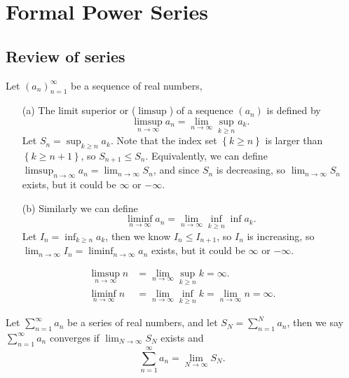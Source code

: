 \chapter{Formal Power Series}
\section{Review of series}
\begin{definition}
    Let \((a_n)_{n=1}^{\infty} \) be a sequence of real numbers,
    \begin{itemize}
        \item [(a)] The limit superior or (\(\limsup\)) of a sequence \((a_n)\) is defined by 
        \[\limsup_{n \to \infty} a_n = \lim_{n \to \infty} \sup _{k \ge n} a_k.  \]
        Let \(S_n = \sup _{k \ge n} a_k\). Note that the index set \(\left\{ k \ge n \right\} \) is larger than \(\left\{ k \ge n+1 \right\} \), so \(S_{n+1} \le S_n\). Equivalently, we can define \(\limsup_{n \to \infty} a_n = \lim_{n \to \infty} S_n  \), and since \(S_n\) is decreasing, so \(\lim_{n \to \infty} S_n \) exists, but it could be \(\infty \) or \(-\infty \). 
        \item [(b)] Similarly we can define 
        \[
            \liminf_{n \to \infty} a_n = \lim_{n \to \infty} \inf _{k \ge n} \inf a_k.  
        \] Let \(I_n = \inf _{k \ge n} a_k\), then we know \(I_n \le I_{n+1}\), so \(I_n\) is increasing, so \(\lim_{n \to \infty} I_n = \liminf_{n \to \infty} a_n  \) exists, but it could be \(\infty \) or \(-\infty \).     
    \end{itemize}
\end{definition}

\begin{eg}
    \begin{align*}
        \limsup_{n \to \infty} n &= \lim_{n \to \infty} \sup _{k \ge n} k = \infty . \\
        \liminf_{n \to \infty} n &= \lim_{n \to \infty} \inf _{k \ge n} k = \lim_{n \to \infty} n = \infty .  
    \end{align*}
\end{eg}

\begin{definition}
    Let \(\sum_{n=1}^{\infty} a_n \) be a series of real numbers, and let \(S_N = \sum_{n=1}^N a_n \), then we say \(\sum_{n=1}^{\infty} a_n \) converges if \(\lim_{N \to \infty} S_N\) exists and 
    \[
        \sum_{n=1}^{\infty} a_n = \lim_{N \to \infty} S_N. 
    \]
\end{definition}

